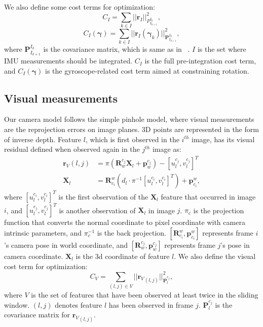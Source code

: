     We also define some cost terms for optimization:
    \begin{equation}
    \label{IMU_cost}
    {C_I} = \sum_{k \in I} ||\textbf{r}_I||^2_{P^{I_k}_{I_{k+1}}},
    \end{equation}
    \begin{equation}
    \label{eq:gyro_cost}
    {C_I}(\bm{\gamma}) = \sum_{k \in I} ||\textbf{r}_I(\bm{\gamma}_k)||^2_{\textbf{P}^{I_k}_{I_{k+1}}}, 
    \end{equation}
    where $\textbf{P}^{I_k}_{I_{k+1}}$ is the covariance matrix, which is same as in ~\cite{qin-tro-2018_VINS-Mono}.  $I$ is the set where IMU measurements should be integrated. $C_I$ is the full pre-integration cost term, and $C_I(\bm{\gamma})$ is the gyroscope-related cost term aimed at constraining rotation.
\subsection{Visual measurements}
Our camera model follows the simple pinhole model, where visual measurements are the reprojection errors on image planes. 3D points are represented in the form of inverse depth. Feature $l$, which is first observed in the $i^{th}$ image, has its visual residual defined when observed again in the $j^{th}$ image as:
 \begin{equation} 
    \begin{aligned}
      \textbf{r}_V(l, j)&=\pi(\textbf{R}_w^{c_j}\textbf{X}_l+\textbf{p}_w^{c_j}) - [u^{c_j}_l,v^{c_j}_l]^T\\
      \textbf{X}_l &= \textbf{R}^w_{c_i}(d_l\cdot{\pi}^{-1}[u^{c_i}_l,v^{c_i}_l]^T) + \textbf{p}^w_{c_i},
    \end{aligned}
  \end{equation}
 where $[u^{c_i}_l,v^{c_i}_l]^T$ is the first observation of the $\textbf{X}_l$ feature that occurred in image $i$, and $[u^{c_j}_l,v^{c_j}_l]^T$ is another observation of $\textbf{X}_l$ in image $j$.  $\pi_c$ is the projection function that converts the normal coordinate to pixel coordinate with camera intrinsic parameters, and $\pi_c^{-1}$ is the back projection. $[\textbf{R}^w_{c_i},\textbf{p}^w_{c_i}]$ represents frame $i$'s camera pose in world coordinate, and $[\textbf{R}_w^{c_j}, \textbf{p}_w^{c_j}]$ represents frame $j$'s pose in camera coordinate. $\textbf{X}_l$ is the 3d coordinate of feature $l$.
 We also define the visual cost term for optimization:
 \begin{equation}
 \label{eq:cost_camera}
     C_V = \sum_{(l, j)\in V} ||{\textbf{r}_V}_{(l, j)}||^2_{\textbf{P}^{c_j}_l},
 \end{equation}
    where $V$ is the set of features that have been observed at least twice in the sliding window. $(l,j)$ denotes feature $l$ has been observed in frame $j$. ${\textbf{P}^{c_j}_l}$ is the covariance matrix for ${\textbf{r}_V}_{(l, j)}$.

